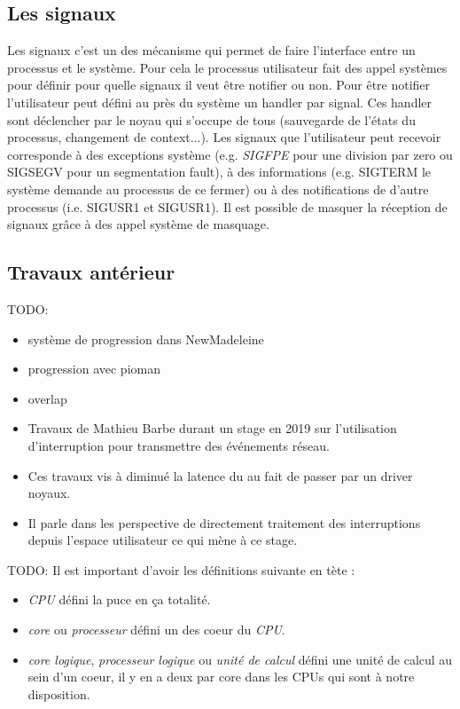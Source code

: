 \subsection{Les signaux}
\label{sec:signal}

Les signaux c'est un des mécanisme qui permet de faire l'interface entre un processus et le système.
Pour cela le processus utilisateur fait des appel systèmes pour définir pour quelle signaux il veut être notifier ou non.
Pour être notifier l'utilisateur peut défini au près du système un handler par signal.
Ces handler sont déclencher par le noyau qui s'occupe de tous (sauvegarde de l'états du processus, changement de context...).
Les signaux que l'utilisateur peut recevoir corresponde à des exceptions système (e.g. \emph{SIGFPE} pour une division par zero ou SIGSEGV pour un segmentation fault),
à des informations (e.g. SIGTERM le système demande au processus de ce fermer) ou à des notifications de d'autre processus (i.e. SIGUSR1 et SIGUSR1).
Il est possible de masquer la réception de signaux grâce à des appel système de masquage.

\subsection{Travaux antérieur}

TODO:

\begin{itemize}
  \item système de progression dans NewMadeleine
  \item progression avec pioman
  \item overlap
  \item Travaux de Mathieu Barbe durant un stage en 2019 sur l'utilisation d'interruption pour transmettre des événements réseau.
  \item Ces travaux vis à diminué la latence du au fait de passer par un driver noyaux.
  \item Il parle dans les perspective de directement traitement des interruptions depuis l'espace utilisateur ce qui mène à ce stage.
\end{itemize}



TODO: Il est important d'avoir les définitions suivante en tète :
\begin{itemize}
  \item \emph{CPU} défini la puce en ça totalité.
  \item \emph{core} ou \emph{processeur} défini un des coeur du \emph{CPU}.
  \item \emph{core logique}, \emph{processeur logique} ou \emph{unité de calcul} %
  défini une unité de calcul au sein d'un coeur, il y en a deux par core dans les CPUs qui sont à notre disposition.
\end{itemize}
